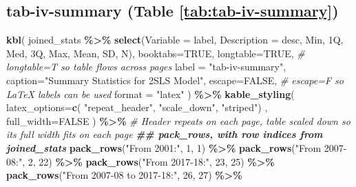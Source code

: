 \documentclass[
]{article}
\newenvironment{Shaded}{\begin{snugshade}}{\end{snugshade}}
\newcommand{\AttributeTok}[1]{\textcolor[rgb]{0.13,0.29,0.53}{#1}}
\newcommand{\CommentTok}[1]{\textcolor[rgb]{0.56,0.35,0.01}{\textit{#1}}}
\newcommand{\ConstantTok}[1]{\textcolor[rgb]{0.56,0.35,0.01}{#1}}
\newcommand{\DecValTok}[1]{\textcolor[rgb]{0.00,0.00,0.81}{#1}}
\newcommand{\DocumentationTok}[1]{\textcolor[rgb]{0.56,0.35,0.01}{\textbf{\textit{#1}}}}
\newcommand{\FunctionTok}[1]{\textcolor[rgb]{0.13,0.29,0.53}{\textbf{#1}}}
\newcommand{\NormalTok}[1]{#1}
\newcommand{\SpecialCharTok}[1]{\textcolor[rgb]{0.81,0.36,0.00}{\textbf{#1}}}
\newcommand{\StringTok}[1]{\textcolor[rgb]{0.31,0.60,0.02}{#1}}
\begin{document}
\subsection*{tab-iv-summary (Table \ref{tab:tab-iv-summary})}\label{tab-iv-summary-table-reftabtab-iv-summary}

\begin{Shaded}
\begin{Highlighting}[]
\FunctionTok{kbl}\NormalTok{(}
\NormalTok{  joined\_stats }\SpecialCharTok{\%\textgreater{}\%} 
      \FunctionTok{select}\NormalTok{(}\AttributeTok{Variable =}\NormalTok{ label, }\AttributeTok{Description =}\NormalTok{ desc, Min, }\StringTok{\textasciigrave{}}\AttributeTok{1Q}\StringTok{\textasciigrave{}}\NormalTok{, Med, }\StringTok{\textasciigrave{}}\AttributeTok{3Q}\StringTok{\textasciigrave{}}\NormalTok{, Max, Mean, SD, N),}
  \AttributeTok{booktabs=}\ConstantTok{TRUE}\NormalTok{, }
  \AttributeTok{longtable=}\ConstantTok{TRUE}\NormalTok{, }\CommentTok{\# longtable=T so table flows across pages}
  \AttributeTok{label =} \StringTok{"tab{-}iv{-}summary"}\NormalTok{, }
  \AttributeTok{caption=}\StringTok{"Summary Statistics for 2SLS Model"}\NormalTok{,}
  \AttributeTok{escape=}\ConstantTok{FALSE}\NormalTok{, }\CommentTok{\# escape=F so LaTeX labels can be used}
  \AttributeTok{format =} \StringTok{"latex"}
\NormalTok{  ) }\SpecialCharTok{\%\textgreater{}\%}
  \FunctionTok{kable\_styling}\NormalTok{(}
    \AttributeTok{latex\_options=}\FunctionTok{c}\NormalTok{(}
      \StringTok{"repeat\_header"}\NormalTok{,}
      \StringTok{"scale\_down"}\NormalTok{,}
      \StringTok{"striped"}\NormalTok{)}
\NormalTok{    , }\AttributeTok{full\_width=}\ConstantTok{FALSE}
\NormalTok{    ) }\SpecialCharTok{\%\textgreater{}\%} \CommentTok{\# Header repeats on each page, table scaled down so its full width fits on each page}
  \DocumentationTok{\#\# pack\_rows, with row indices from joined\_stats}
  \FunctionTok{pack\_rows}\NormalTok{(}\StringTok{"From 2001:"}\NormalTok{, }\DecValTok{1}\NormalTok{, }\DecValTok{1}\NormalTok{) }\SpecialCharTok{\%\textgreater{}\%}
  \FunctionTok{pack\_rows}\NormalTok{(}\StringTok{"From 2007{-}08:"}\NormalTok{, }\DecValTok{2}\NormalTok{, }\DecValTok{22}\NormalTok{) }\SpecialCharTok{\%\textgreater{}\%}
  \FunctionTok{pack\_rows}\NormalTok{(}\StringTok{"From 2017{-}18:"}\NormalTok{, }\DecValTok{23}\NormalTok{, }\DecValTok{25}\NormalTok{) }\SpecialCharTok{\%\textgreater{}\%}
  \FunctionTok{pack\_rows}\NormalTok{(}\StringTok{"From 2007{-}08 to 2017{-}18:"}\NormalTok{, }\DecValTok{26}\NormalTok{, }\DecValTok{27}\NormalTok{) }\SpecialCharTok{\%\textgreater{}\%}

\end{Highlighting}
\end{Shaded}
\end{document}
